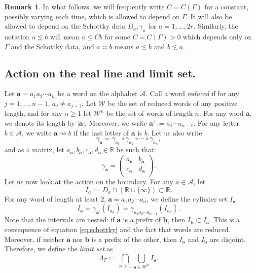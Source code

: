 \documentclass[12pt]{amsart}
\newcommand{\R}{\mathbb{R}}
\newcommand*\abs[1]{
	\left|#1\right|
}
\theoremstyle{definition}
\newtheorem*{rem}{Remark}
\renewcommand{\leq}{\leqslant}
\renewcommand{\geq}{\geqslant}
\begin{document}
\begin{rem}In what follows, we will frequently write $C = C(\Gamma)$ for a constant, possibly varying each time, which is allowed to depend on $\Gamma$. It will also be allowed to depend on the Schottky data $D_a, \gamma_a$ for $a = 1, \ldots, 2r$. Similarly, the notation $a \lesssim b$ will mean $a \leq Cb$ for some $C = C(\Gamma) > 0$ which depends only on $\Gamma$ and the Schottky data, and $a \asymp b$ means $a \lesssim b$ and $b\lesssim a$.
\end{rem}

\subsection{Action on the real line and limit set.}
Let $\mathbf{a} = a_1a_2\cdots a_n$ be a word on the alphabet $\mathcal{A}$. Call a word \emph{reduced} if for any $j = 1, \ldots, n - 1$, $a_j \neq \overline{a_{j+1}}$. Let $\mathcal{W}$ be the set of reduced words of any positive length, and for any $n\geq 1$ let $\mathcal{W}^n$ be the set of words of length $n$. For any word $\mathbf{a}$, we denote its length by $\abs{\mathbf{a}}$. Moreover, we write $\mathbf{a}' := a_1\cdots a_{n - 1}$. For any letter $b \in \mathcal{A}$, we write $\mathbf{a} \rightsquigarrow b$ if the last letter of $\mathbf{a}$ is $b$. Let us also write
\[\gamma_\mathbf{a} = \gamma_{a_1} \circ \gamma_{a_2} \circ \cdots \circ \gamma_{a_n},\]
and as a matrix, let $a_\mathbf{a}, b_\mathbf{a}, c_\mathbf{a}, d_\mathbf{a} \in \R$ be such that:
\[\gamma_{\mathbf{a}} = \left({\begin{array}{cc}
   a_\mathbf{a} & b_\mathbf{a} \\
   c_\mathbf{a} & d_\mathbf{a} \\
  \end{array} } \right).\]
Let us now look at the action on the boundary. For any $a\in\mathcal{A}$, let
\[I_a := D_a \cap \left(\R\cup\{\infty\}\right) \subset \R.\]
For any word of length at least $2$, $\mathbf{a} = a_1a_2\cdots a_n$, we define the cylinder set $I_\mathbf{a}$
\[I_\mathbf{a} = \gamma_{\mathbf{a}'}(I_{a_n}) = \gamma_{a_1a_2\cdots a_{n - 1}}(I_{a_n}).\]
Note that the intervals are nested: if $\mathbf{a}$ is a prefix of $\mathbf{b}$, then $I_\mathbf{b} \subset I_\mathbf{a}$. This is a consequence of equation \eqref{eq:schottky} and the fact that words are reduced. Moreover, if neither $\mathbf{a}$ nor $\mathbf{b}$ is a prefix of the other, then $I_\mathbf{a}$ and $I_\mathbf{b}$ are disjoint. Therefore, we define the \emph{limit set} as
\[\Lambda_\Gamma := \bigcap_{n \geq 1} \bigcup_{\mathbf{a} \in \mathcal{W}^n} I_\mathbf{a}.\]
\end{document}

